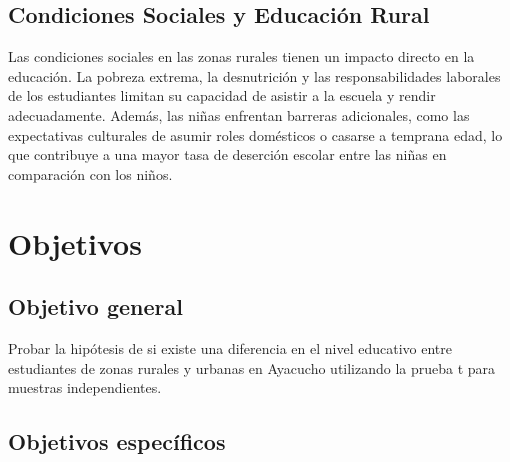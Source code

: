 \documentclass[
]{article}
\begin{document}
\subsection*{Condiciones Sociales y Educación
Rural}\label{condiciones-sociales-y-educaciuxf3n-rural}

\vspace{0.5cm}

Las condiciones sociales en las zonas rurales tienen un impacto directo
en la educación. La pobreza extrema, la desnutrición y las
responsabilidades laborales de los estudiantes limitan su capacidad de
asistir a la escuela y rendir adecuadamente. Además, las niñas enfrentan
barreras adicionales, como las expectativas culturales de asumir roles
domésticos o casarse a temprana edad, lo que contribuye a una mayor tasa
de deserción escolar entre las niñas en comparación con los niños.

\section*{Objetivos}\label{objetivos}

\subsection*{Objetivo general}\label{objetivo-general}

\vspace{0.25cm}

Probar la hipótesis de si existe una diferencia en el nivel educativo
entre estudiantes de zonas rurales y urbanas en Ayacucho utilizando la
prueba t para muestras independientes.

\subsection*{Objetivos específicos}\label{objetivos-especuxedficos}

\vspace{0.5cm}
\end{document}
